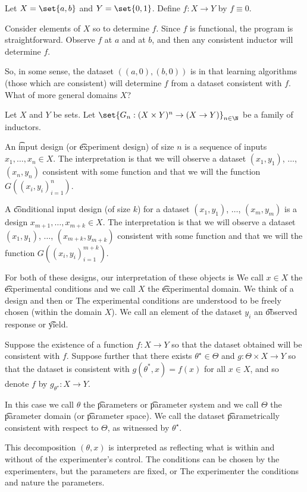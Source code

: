 

Let $X = \set{a, b}$ and $Y = \set{0, 1}$. Define $f: X \to Y$ by $f \equiv 0$.

Consider  elements of $X$ so to determine $f$.
Since $f$ is functional, the program is straightforward.
Observe $f$ at $a$ and at $b$, and then any consistent inductor will determine $f$.

So, in some sense, the dataset $((a,0), (b,0))$ is  in that  learning algorithms (those which are consistent) will determine $f$ from a dataset consistent with $f$.
What of more general domains $X$?


Let $X$ and $Y$ be sets.
Let $\set{G_n: (X \times Y)^n \to (X \to Y)}_{n \in \N}$ be a family of inductors.

An \t{input design} (or \t{experiment design}) of size $n$ is a sequence of inputs $x_1, \dots, x_n \in X$.
The interpretation is that we will observe a dataset $(x_1, y_1)$, $\dots$, $(x_n, y_n)$ consistent with some function and that we will  the function $G((x_i,y_i)_{i = 1}^{n})$.

A \t{conditional input design} (of size $k$) for a dataset $(x_1,y_1)$, $\dots$, $(x_m, y_m)$ is a design $x_{m+1}, \dots, x_{m+k} \in X$.
The interpretation is that we will observe a dataset $(x_1, y_1)$, $\dots$, $(x_{m+k}, y_{m+k})$ consistent with some function and that we will  the function $G((x_i,y_i)_{i = 1}^{m+k})$.

For both of these designs, our interpretation of these objects is  
We call $x \in X$ the \t{experimental conditions} and we call $X$ the \t{experimental domain}.
We think of  a design and then  or 
The experimental conditions are understood to be freely chosen (within the domain $X$).
We call an element of the dataset $y_i$ an \t{observed response} or \t{yield}.


Suppose the existence of a function $f: X \to Y$ so that the dataset obtained will be consistent with $f$.
Suppose further that there exists $\theta^\star \in \Theta$ and $g: \Theta \times X \to Y$ so that the dataset is consistent with $g(\theta^*, x) = f(x)$ for all $x \in X$, and so denote $f$ by $g_{\theta^{\star}}: X \to Y$.

In this case we call $\theta$ the \t{parameters} or \t{parameter system} and we call $\Theta$ the \t{parameter domain} (or \t{parameter space}).
We call the dataset \t{parametrically consistent} with respect to $\Theta$, as witnessed by $\theta^{\star}$.

This decomposition $(\theta, x)$ is interpreted as reflecting what is within and without of the experimenter's control.
The conditions can be chosen by the experimenters, but the parameters are fixed, or 
The experimenter  the conditions and nature  the parameters.

\blankpage
